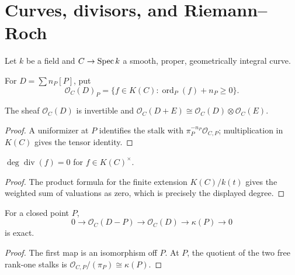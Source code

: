 \chapter{Curves, divisors, and Riemann--Roch}
\label{pa-ch-curves}

Let \(k\) be a field and \(C\to\operatorname{Spec} k\) a smooth, proper, geometrically
integral curve.

\begin{definition}
  \label{pa-def-divisor-line-bundle}
  \cite{hartshorne-ag}
  For \(D=\sum n_P[P]\), put
  \[
    \mathcal O_C(D)_P=\{f\in K(C):\operatorname{ord}_P(f)+n_P\ge0\}.
  \]
\end{definition}

\begin{lemma}
  \label{pa-lem-divisor-bundle-tensor}
  \cite{hartshorne-ag}
  The sheaf \(\mathcal O_C(D)\) is invertible and
  \(\mathcal O_C(D+E)\cong\mathcal O_C(D)\otimes\mathcal O_C(E)\).
\end{lemma}

\begin{proof}
  A uniformizer at \(P\) identifies the stalk with
  \(\pi_P^{-n_P}\mathcal O_{C,P}\); multiplication in \(K(C)\) gives the
  tensor identity.
\end{proof}

\begin{lemma}
  \label{pa-lem-principal-degree-zero}
  \cite{hartshorne-ag,papaioannou-rr}
  \(\deg\operatorname{div}(f)=0\) for \(f\in K(C)^\times\).
\end{lemma}

\begin{proof}
  The product formula for the finite extension \(K(C)/k(t)\) gives the
  weighted sum of valuations as zero, which is precisely the displayed degree.
\end{proof}

\begin{lemma}
  \label{pa-lem-divisor-exact-sequence}
  \cite{hartshorne-ag}
  For a closed point \(P\),
  \[
    0\to\mathcal O_C(D-P)\to\mathcal O_C(D)\to\kappa(P)\to0
  \]
  is exact.
\end{lemma}

\begin{proof}
  The first map is an isomorphism off \(P\).  At \(P\), the quotient of the
  two free rank-one stalks is
  \(\mathcal O_{C,P}/(\pi_P)\cong\kappa(P)\).
\end{proof}

